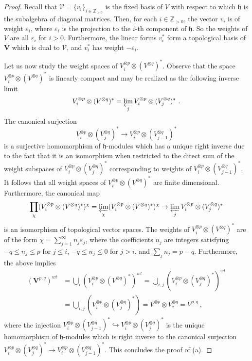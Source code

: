\documentclass[12pt,reqno]{amsart}
\theoremstyle{definition}
\theoremstyle{remark}
\begin{document}
	\begin{proof} 
	    Recall that $\mathcal{V} = \{v_i\}_{i\in\mathbb{Z}_{>0}}$ is the fixed basis of $V$ with respect to which $\mathfrak{h}$ is the subalgebra of diagonal matrices. Then, for each $i\in\mathbb{Z}_{>0}$, the vector $v_i$ is of weight $\varepsilon_i$, where $\varepsilon_i$ is the projection to the $i$-th component of $\mathfrak{h}$. So the weights of $V$ are all $\varepsilon_i$ for $i>0$. Furthermore, the linear forms $v_i ^\ast$ form a topological basis of $\mathbf{V}$ which is dual to $\mathcal{V}$, and $v_i ^\ast$ has weight $-\varepsilon_i$. 
	    
	    Let us now study the weight spaces of $V_i ^{\otimes p}\otimes (V^{\otimes q})^*$. Observe that the space $V_i ^{\otimes p}\otimes (V^{\otimes q})^*$ is linearly compact and may be realized as the following inverse limit
	    $$
	    V_i ^{\otimes p}\otimes (V^{\otimes q})^* = 
	    \varprojlim_j 	V_i ^{\otimes p}\otimes (V_j ^{\otimes q})^* \ .
	    $$
	    The canonical surjection 
	    $$
	    V_i ^{\otimes p}\otimes (V_j ^{\otimes q})^* \rightarrow
	    	V_i ^{\otimes p}\otimes (V_{j-1} ^{\otimes q})^*
	    $$
	    is a surjective homomorphism of $\mathfrak{h}$-modules which has a unique right inverse due to the fact that it is an isomorphism when restricted to the direct sum of the weight subspaces of 
	    $V_i ^{\otimes p}\otimes (V_j^{\otimes q})^*$ corresponding to weights of 
	    $V_i ^{\otimes p}\otimes (V_{j-1}^{\otimes q})^*$. It follows that all weight spaces of 
	    $V_i ^{\otimes p}\otimes (V^{\otimes q})^*$ are finite dimensional. Furthermore, the canonical map
	    $$
	    \prod_\chi (V_i ^{\otimes p}\otimes (V^{\otimes q})^*)^\chi =
	    \varprojlim_\chi (V_i ^{\otimes p}\otimes (V^{\otimes q})^* )^\chi
	    \rightarrow 
	    \varprojlim_j V_i ^{\otimes p}\otimes (V_j^{\otimes q})^*
	    $$
	    	is an isomorphism of topological vector spaces. The weights of 
	$V_i ^{\otimes p}\otimes (V^{\otimes q})^*$ are of the form $\chi = \sum_{j=1}^{\infty}n_j \varepsilon_j$, where the coefficients $n_j$ are integers satisfying $-q \leq n_j \leq p$ for $j\leq i$, $-q \leq n_j \leq 0$ for $j > i$, and $\sum_j n_j = p-q$. 
	Furthermore, the above implies
	\begin{equation*}
	    \begin{split}
	    (\mathbf{V}^{p,q})^{wt} & = \bigcup_i (V_i ^{\otimes p}\otimes (V^{\otimes q})^*)^{wt} =
	\bigcup_{i,j} (V_i ^{\otimes p}\otimes (V_j^{\otimes q})^*)^{wt} \\
	& = 
	\bigcup_{i,j} (V_i ^{\otimes p}\otimes (V_j^{\otimes q})^*) 
	=  V ^{\otimes p}\otimes V_\ast^{\otimes q} = {V}^{p,q} \ ,
	\end{split}
	\end{equation*}
		where the injection 
	$V_i ^{\otimes p}\otimes (V_{j-1}^{\otimes q})^*
	\hookrightarrow
	V_i ^{\otimes p}\otimes (V_j^{\otimes q})^*$ is the unique homomorphism of $\mathfrak{h}$-modules which is right inverse to the canonical surjection 
	$V_i ^{\otimes p}\otimes (V_j^{\otimes q})^*
	\rightarrow
	V_i ^{\otimes p}\otimes (V_{j-1}^{\otimes q})^*$.
	This concludes the proof of (a).
	

\end{proof}
\end{document}
